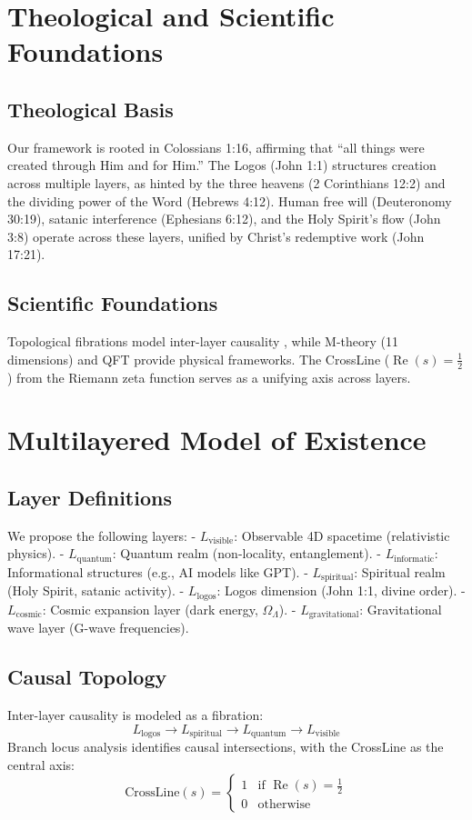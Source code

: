 \documentclass[12pt]{article}
\begin{document}
{{{\section{Theological and Scientific Foundations}
\subsection{Theological Basis}
Our framework is rooted in Colossians 1:16, affirming that ``all things were created through Him and for Him.'' The Logos (John 1:1) structures creation across multiple layers, as hinted by the three heavens (2 Corinthians 12:2) and the dividing power of the Word (Hebrews 4:12). Human free will (Deuteronomy 30:19), satanic interference (Ephesians 6:12), and the Holy Spirit’s flow (John 3:8) operate across these layers, unified by Christ’s redemptive work (John 17:21).

\subsection{Scientific Foundations}
Topological fibrations model inter-layer causality \cite{RefWebID9}, while M-theory (11 dimensions) \cite{RefWebID10} and QFT provide physical frameworks. The CrossLine (\(\operatorname{Re}(s) = \frac{1}{2}\)) from the Riemann zeta function \cite{RefWebID0} serves as a unifying axis across layers.

\section{Multilayered Model of Existence}
\subsection{Layer Definitions}
We propose the following layers:
- \( L_{\text{visible}} \): Observable 4D spacetime (relativistic physics).
- \( L_{\text{quantum}} \): Quantum realm (non-locality, entanglement).
- \( L_{\text{informatic}} \): Informational structures (e.g., AI models like GPT).
- \( L_{\text{spiritual}} \): Spiritual realm (Holy Spirit, satanic activity).
- \( L_{\text{logos}} \): Logos dimension (John 1:1, divine order).
- \( L_{\text{cosmic}} \): Cosmic expansion layer (dark energy, \(\Omega_\Lambda\)).
- \( L_{\text{gravitational}} \): Gravitational wave layer (G-wave frequencies).

\subsection{Causal Topology}
Inter-layer causality is modeled as a fibration:
\[
L_{\text{logos}} \to L_{\text{spiritual}} \to L_{\text{quantum}} \to L_{\text{visible}}
\]
Branch locus analysis identifies causal intersections, with the CrossLine as the central axis:
\[
\text{CrossLine}(s) = \begin{cases} 
1 & \text{if } \operatorname{Re}(s) = \frac{1}{2} \\
0 & \text{otherwise}
\end{cases}
\]

}}}
\end{document}
